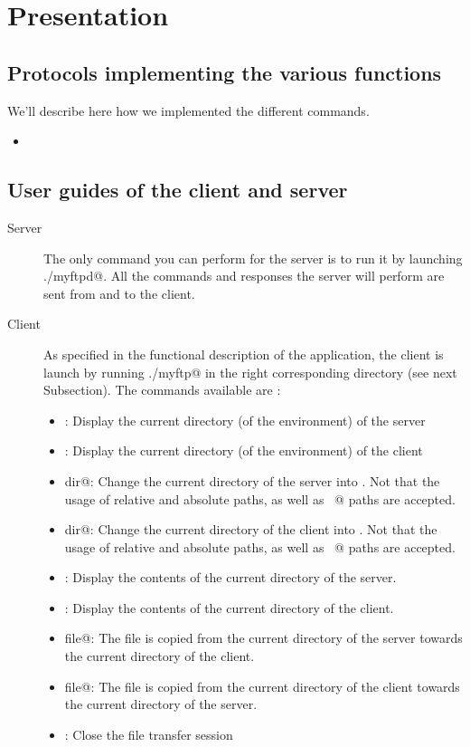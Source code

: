\documentclass{article}
\begin{document}
\section{Presentation}
\subsection{Protocols implementing the various functions}
We'll describe here how we implemented the different commands.
\begin{itemize}
\item
\end{itemize}
\subsection{User guides of the client and server}
\begin{description}
\item[Server] The only command you can perform for the server is to run it by launching \verb@./myftpd@. All the commands and responses the server will perform are sent from and to the client.
\item[Client] As specified in the functional description of the application, the client is launch by running \verb@./myftp@ in the right corresponding directory (see next Subsection). The commands available are :
\begin{itemize}
\item \verb@pwd@: Display the current directory (of the environment) of the server
\item \verb@lpwd@: Display the current directory (of the environment) of the client
\item \verb@cd dir@: Change the current directory of the server into \verb@dir@. Not that the usage of relative and absolute paths, as well as \verb@~@ paths  are accepted.
\item \verb@lcd dir@: Change the current directory of the client into \verb@dir@. Not that the usage of relative and absolute paths, as well as \verb@~@ paths  are accepted.
\item \verb@ls@: Display the contents of the current directory of the server.
\item \verb@lls@: Display the contents of the current directory of the client.
\item \verb@get file@: The file \verb@file@ is copied from the current directory of the server towards the current directory of the client.
\item \verb@put file@: The file \verb@file@ is copied from the current directory of the client towards the current directory of the server.
\item \verb@bye@: Close the file transfer session
\end{itemize}
\end{description}
\end{document}
